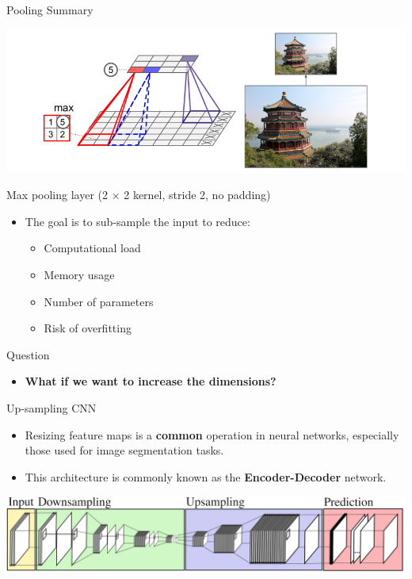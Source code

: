 \documentclass[default, aspectratio=169]{beamer}
\begin{document}
	\begin{frame}{Pooling Summary}
		\begin{minipage}{0.5\textwidth}
			\centering
			\includegraphics[keepaspectratio, scale=0.25]{pic/Pooling_2.png}
			
			\vspace{0.3cm}
			\small Max pooling layer (2 $\times$ 2 kernel, stride 2, no padding)
		\end{minipage}%
		\hspace{0.4cm}  %
		\begin{minipage}{0.45\textwidth}
			\begin{itemize}
				\item The goal is to sub-sample the input to reduce:
				\begin{itemize}
					\item Computational load
					\item Memory usage
					\item Number of parameters
					\item Risk of overfitting
				\end{itemize}
			\end{itemize}
		\end{minipage}
	\end{frame}
	\begin{frame}{Question}
		\centering
		\begin{itemize}
			\centering
			\item \Large \textbf{What if we want to increase the dimensions?}
		\end{itemize}
	\end{frame}
	\begin{frame}{Up-sampling CNN}
		\vspace{0.5cm}
		\begin{itemize}
			\item Resizing feature maps is a \textbf{common} operation in neural networks, especially those used for image segmentation tasks.
			\item This architecture is commonly known as the \textbf{Encoder-Decoder} network.
		\end{itemize}
		\bigskip
		\centering
		\includegraphics[keepaspectratio, scale=0.2]{pic/Upsamlpe_0.png}
		
	\end{frame}
\end{document}
